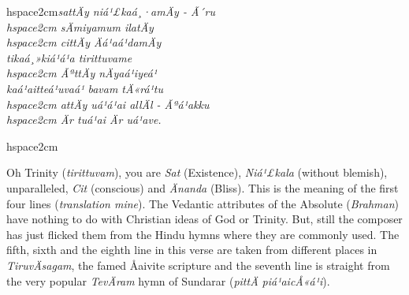 \begin{myquote}
hspace{2cm}\textit{sattÄy niá¹£kaá¸·amÄy - Ã´ru\\hspace{2cm} sÄmiyamum ilatÄy \\hspace{2cm} cittÄy Äá¹aá¹damÄy\\ tikaá¸»kiá¹á¹a tirittuvame\\hspace{2cm} ÃªttÄy nÄyaá¹­iyeá¹\\ kaá¹­aitteá¹uvaá¹ bavam tÄ«rá¹tu\\hspace{2cm} attÄy uá¹á¹ai allÄl - Ãªá¹akku\\hspace{2cm} Är tuá¹ai Är uá¹ave.}
\end{myquote}

\begin{myquote}
hspace{2cm}
\end{myquote}

Oh Trinity (\textit{tirittuvam}), you are \textit{Sat} (Existence), \textit{Niá¹£kala} (without blemish), unparalleled, \textit{Cit} (conscious) and \textit{Änanda} (Bliss). This is the meaning of the first four lines (\textit{translation mine}). The Vedantic attributes of the Absolute (\textit{Brahman}) have nothing to do with Christian ideas of God or Trinity. But, still the composer has just flicked them from the Hindu hymns where they are commonly used. The fifth, sixth and the eighth line in this verse are taken from different places in \textit{TiruvÄsagam}, the famed Åaivite scripture and the seventh line is straight from the very popular \textit{TevÄram} hymn of Sundarar (\textit{pittÄ piá¹aicÅ«á¹­i}).

